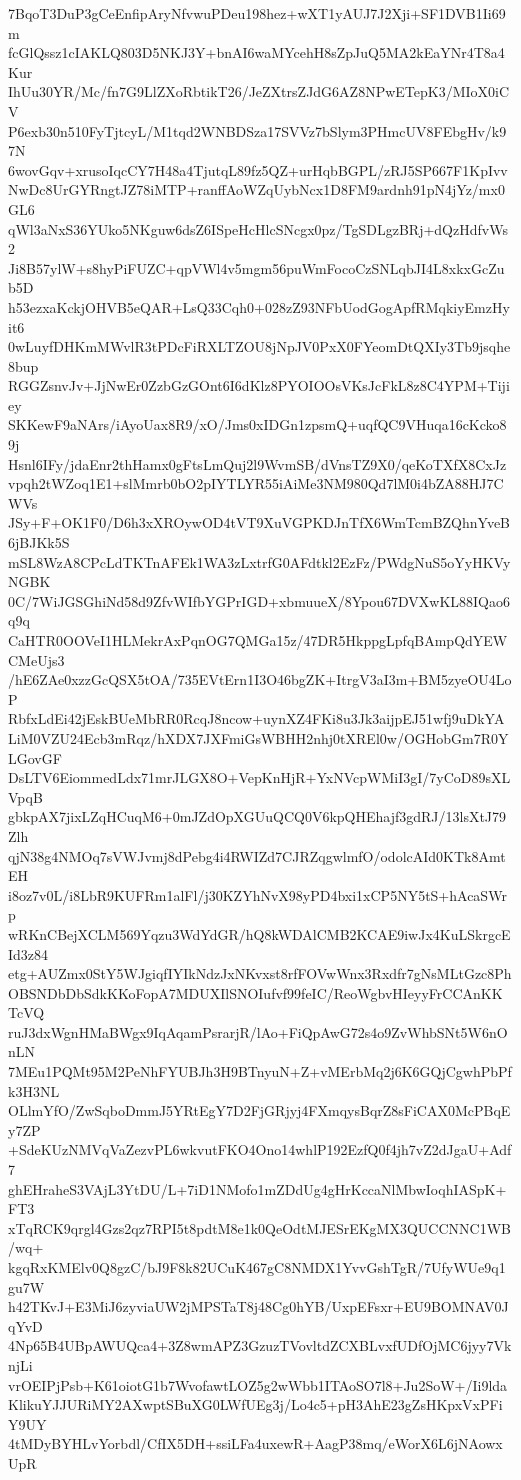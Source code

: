 7BqoT3DuP3gCeEnfipAryNfvwuPDeu198hez+wXT1yAUJ7J2Xji+SF1DVB1Ii69m
fcGlQssz1cIAKLQ803D5NKJ3Y+bnAI6waMYcehH8sZpJuQ5MA2kEaYNr4T8a4Kur
IhUu30YR/Mc/fn7G9LlZXoRbtikT26/JeZXtrsZJdG6AZ8NPwETepK3/MIoX0iCV
P6exb30n510FyTjtcyL/M1tqd2WNBDSza17SVVz7bSlym3PHmcUV8FEbgHv/k97N
6wovGqv+xrusoIqcCY7H48a4TjutqL89fz5QZ+urHqbBGPL/zRJ5SP667F1KpIvv
NwDc8UrGYRngtJZ78iMTP+ranffAoWZqUybNcx1D8FM9ardnh91pN4jYz/mx0GL6
qWl3aNxS36YUko5NKguw6dsZ6ISpeHcHlcSNcgx0pz/TgSDLgzBRj+dQzHdfvWs2
Ji8B57ylW+s8hyPiFUZC+qpVWl4v5mgm56puWmFocoCzSNLqbJI4L8xkxGcZub5D
h53ezxaKckjOHVB5eQAR+LsQ33Cqh0+028zZ93NFbUodGogApfRMqkiyEmzHyit6
0wLuyfDHKmMWvlR3tPDcFiRXLTZOU8jNpJV0PxX0FYeomDtQXIy3Tb9jsqhe8bup
RGGZsnvJv+JjNwEr0ZzbGzGOnt6I6dKlz8PYOIOOsVKsJcFkL8z8C4YPM+Tijiey
SKKewF9aNArs/iAyoUax8R9/xO/Jms0xIDGn1zpsmQ+uqfQC9VHuqa16cKcko89j
Hsnl6IFy/jdaEnr2thHamx0gFtsLmQuj2l9WvmSB/dVnsTZ9X0/qeKoTXfX8CxJz
vpqh2tWZoq1E1+slMmrb0bO2pIYTLYR55iAiMe3NM980Qd7lM0i4bZA88HJ7CWVs
JSy+F+OK1F0/D6h3xXROywOD4tVT9XuVGPKDJnTfX6WmTcmBZQhnYveB6jBJKk5S
mSL8WzA8CPcLdTKTnAFEk1WA3zLxtrfG0AFdtkl2EzFz/PWdgNuS5oYyHKVyNGBK
0C/7WiJGSGhiNd58d9ZfvWIfbYGPrIGD+xbmuueX/8Ypou67DVXwKL88IQao6q9q
CaHTR0OOVeI1HLMekrAxPqnOG7QMGa15z/47DR5HkppgLpfqBAmpQdYEWCMeUjs3
/hE6ZAe0xzzGcQSX5tOA/735EVtErn1I3O46bgZK+ItrgV3aI3m+BM5zyeOU4LoP
RbfxLdEi42jEskBUeMbRR0RcqJ8ncow+uynXZ4FKi8u3Jk3aijpEJ51wfj9uDkYA
LiM0VZU24Ecb3mRqz/hXDX7JXFmiGsWBHH2nhj0tXREl0w/OGHobGm7R0YLGovGF
DsLTV6EiommedLdx71mrJLGX8O+VepKnHjR+YxNVcpWMiI3gI/7yCoD89sXLVpqB
gbkpAX7jixLZqHCuqM6+0mJZdOpXGUuQCQ0V6kpQHEhajf3gdRJ/13lsXtJ79Zlh
qjN38g4NMOq7sVWJvmj8dPebg4i4RWIZd7CJRZqgwlmfO/odolcAId0KTk8AmtEH
i8oz7v0L/i8LbR9KUFRm1alFl/j30KZYhNvX98yPD4bxi1xCP5NY5tS+hAcaSWrp
wRKnCBejXCLM569Yqzu3WdYdGR/hQ8kWDAlCMB2KCAE9iwJx4KuLSkrgcEId3z84
etg+AUZmx0StY5WJgiqfIYIkNdzJxNKvxst8rfFOVwWnx3Rxdfr7gNsMLtGzc8Ph
OBSNDbDbSdkKKoFopA7MDUXIlSNOIufvf99feIC/ReoWgbvHIeyyFrCCAnKKTcVQ
ruJ3dxWgnHMaBWgx9IqAqamPsrarjR/lAo+FiQpAwG72s4o9ZvWhbSNt5W6nOnLN
7MEu1PQMt95M2PeNhFYUBJh3H9BTnyuN+Z+vMErbMq2j6K6GQjCgwhPbPfk3H3NL
OLlmYfO/ZwSqboDmmJ5YRtEgY7D2FjGRjyj4FXmqysBqrZ8sFiCAX0McPBqEy7ZP
+SdeKUzNMVqVaZezvPL6wkvutFKO4Ono14whlP192EzfQ0f4jh7vZ2dJgaU+Adf7
ghEHraheS3VAjL3YtDU/L+7iD1NMofo1mZDdUg4gHrKccaNlMbwIoqhIASpK+FT3
xTqRCK9qrgl4Gzs2qz7RPI5t8pdtM8e1k0QeOdtMJESrEKgMX3QUCCNNC1WB/wq+
kgqRxKMElv0Q8gzC/bJ9F8k82UCuK467gC8NMDX1YvvGshTgR/7UfyWUe9q1gu7W
h42TKvJ+E3MiJ6zyviaUW2jMPSTaT8j48Cg0hYB/UxpEFsxr+EU9BOMNAV0JqYvD
4Np65B4UBpAWUQca4+3Z8wmAPZ3GzuzTVovltdZCXBLvxfUDfOjMC6jyy7VknjLi
vrOEIPjPsb+K61oiotG1b7WvofawtLOZ5g2wWbb1ITAoSO7l8+Ju2SoW+/Ii9lda
KlikuYJJURiMY2AXwptSBuXG0LWfUEg3j/Lo4c5+pH3AhE23gZsHKpxVxPFiY9UY
4tMDyBYHLvYorbdl/CfIX5DH+ssiLFa4uxewR+AagP38mq/eWorX6L6jNAowxUpR
